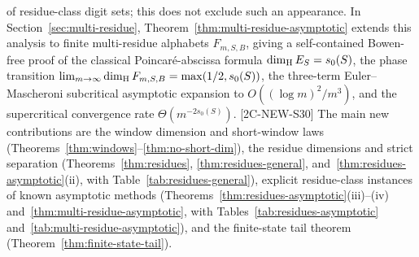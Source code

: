 of residue-class digit sets; this does not exclude such an appearance.
In
Section~\ref{sec:multi-residue}, Theorem~\ref{thm:multi-residue-asymptotic}
extends this analysis to finite multi-residue alphabets $F_{m,S,B}$, giving a
self-contained Bowen-free proof of the classical Poincar\'e-abscissa formula
$\dim_{\mathrm{H}} E_S=s_0(S)$, the phase transition
$\lim_{m\to\infty}\dim_{\mathrm{H}} F_{m,S,B}=\max(1/2,s_0(S))$, the three-term
Euler--Mascheroni subcritical asymptotic expansion to $O((\log m)^2/m^3)$, and
the supercritical convergence rate $\Theta(m^{-2s_0(S)})$.
[2C-NEW-S30] The main new contributions are the window dimension and
short-window laws (Theorems~\ref{thm:windows}--\ref{thm:no-short-dim}),
the residue dimensions and strict separation (Theorems~\ref{thm:residues},
\ref{thm:residues-general}, and~\ref{thm:residues-asymptotic}(ii), with
Table~\ref{tab:residues-general}), explicit residue-class instances of known
asymptotic methods (Theorems~\ref{thm:residues-asymptotic}(iii)--(iv)
and~\ref{thm:multi-residue-asymptotic}, with Tables~\ref{tab:residues-asymptotic}
and~\ref{tab:multi-residue-asymptotic}), and
the finite-state tail theorem (Theorem~\ref{thm:finite-state-tail}).

